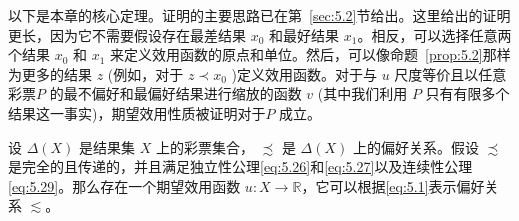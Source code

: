 以下是本章的核心定理。证明的主要思路已在第~\ref{sec:5.2}节给出。这里给出的证明更长，因为它不需要假设存在最差结果 \({x}_{0}\) 和最好结果 \({x}_{1}\)。相反，可以选择任意两个结果 \({x}_{0}\) 和 \({x}_{1}\) 来定义效用函数的原点和单位。然后，可以像命题~\ref{prop:5.2}那样为更多的结果 \(z\) (例如，对于 \(z \prec  {x}_{0}\) )定义效用函数。对于与 \(u\) 尺度等价且以任意彩票\(P\) 的最不偏好和最偏好结果进行缩放的函数 \(v\) (其中我们利用 \(P\) 只有有限多个结果这一事实)，期望效用性质被证明对于\(P\) 成立。

\begin{theorem}\label{theo:5.4}
设 \(\Delta \left( X\right)\) 是结果集 \(X\) 上的彩票集合， \(\precsim\) 是 \(\Delta \left( X\right)\) 上的偏好关系。假设 \(\precsim\) 是完全的且传递的，并且满足独立性公理\eqref{eq:5.26}和\eqref{eq:5.27}以及连续性公理\eqref{eq:5.29}。那么存在一个期望效用函数 \(u : X \rightarrow  \mathbb{R}\)，它可以根据\eqref{eq:5.1}表示偏好关系 \(\lesssim\)。
\end{theorem}

